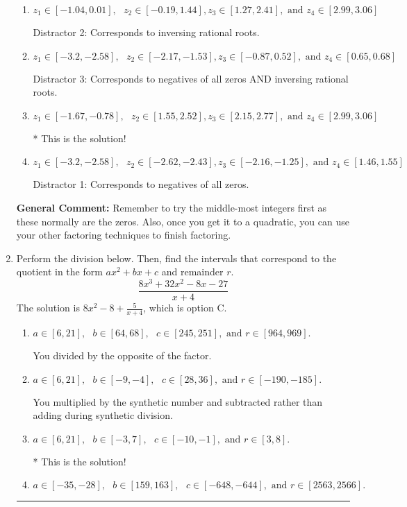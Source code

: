 \documentclass{extbook}[14pt]
\newcommand{\litem}[1]{\item #1

\rule{\textwidth}{0.4pt}}
\begin{document}
\begin{enumerate}
{\begin{enumerate}[label=\Alph*.]
 Distractor 4: Corresponds to moving factors from one rational to another.
\item \( z_1 \in [-1.04, 0.01], \text{   }  z_2 \in [-0.19, 1.44], z_3 \in [1.27, 2.41], \text{   and   } z_4 \in [2.99, 3.06] \)

 Distractor 2: Corresponds to inversing rational roots.
\item \( z_1 \in [-3.2, -2.58], \text{   }  z_2 \in [-2.17, -1.53], z_3 \in [-0.87, 0.52], \text{   and   } z_4 \in [0.65, 0.68] \)

 Distractor 3: Corresponds to negatives of all zeros AND inversing rational roots.
\item \( z_1 \in [-1.67, -0.78], \text{   }  z_2 \in [1.55, 2.52], z_3 \in [2.15, 2.77], \text{   and   } z_4 \in [2.99, 3.06] \)

* This is the solution!
\item \( z_1 \in [-3.2, -2.58], \text{   }  z_2 \in [-2.62, -2.43], z_3 \in [-2.16, -1.25], \text{   and   } z_4 \in [1.46, 1.55] \)

 Distractor 1: Corresponds to negatives of all zeros.
\end{enumerate}

\textbf{General Comment:} Remember to try the middle-most integers first as these normally are the zeros. Also, once you get it to a quadratic, you can use your other factoring techniques to finish factoring.
}
\litem{
Perform the division below. Then, find the intervals that correspond to the quotient in the form $ax^2+bx+c$ and remainder $r$.
\[ \frac{8x^{3} +32 x^{2} -8 x -27}{x + 4} \]The solution is \( 8x^{2} -8 + \frac{5}{x + 4} \), which is option C.\begin{enumerate}[label=\Alph*.]
\item \( a \in [6, 21], \text{   } b \in [64, 68], \text{   } c \in [245, 251], \text{   and   } r \in [964, 969]. \)

 You divided by the opposite of the factor.
\item \( a \in [6, 21], \text{   } b \in [-9, -4], \text{   } c \in [28, 36], \text{   and   } r \in [-190, -185]. \)

 You multiplied by the synthetic number and subtracted rather than adding during synthetic division.
\item \( a \in [6, 21], \text{   } b \in [-3, 7], \text{   } c \in [-10, -1], \text{   and   } r \in [3, 8]. \)

* This is the solution!
\item \( a \in [-35, -28], \text{   } b \in [159, 163], \text{   } c \in [-648, -644], \text{   and   } r \in [2563, 2566]. \)


\end{enumerate}}
\end{enumerate}
\end{document}
